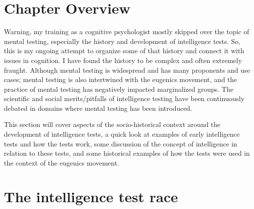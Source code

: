 \documentclass[
  oneside,
  12pt]{crumpbook}
\begin{document}
\hypertarget{chapter-overview-3}{%
\section{Chapter Overview}\label{chapter-overview-3}}

Warning, my training as a cognitive psychologist mostly skipped over the topic of mental testing, especially the history and development of intelligence tests. So, this is my ongoing attempt to organize some of that history and connect it with issues in cognition. I have found the history to be complex and often extremely fraught. Although mental testing is widespread and has many proponents and use cases; mental testing is also intertwined with the eugenics movement, and the practice of mental testing has negatively impacted marginalized groups. The scientific and social merits/pitfalls of intelligence testing have been continuously debated in domains where mental testing has been introduced.

This section will cover aspects of the socio-historical context around the development of intelligence tests, a quick look at examples of early intelligence tests and how the tests work, some discussion of the concept of intelligence in relation to these tests, and some historical examples of how the tests were used in the context of the eugenics movement.

\hypertarget{the-intelligence-test-race}{%
\section{The intelligence test race}\label{the-intelligence-test-race}}
\end{document}
